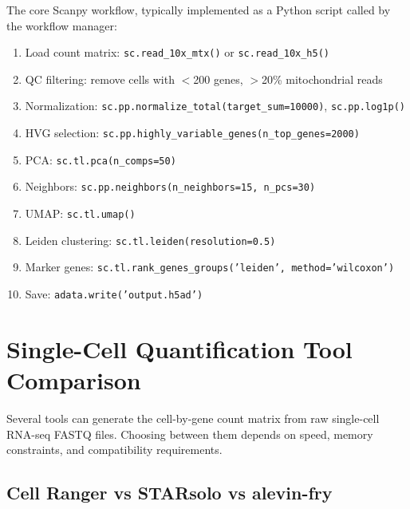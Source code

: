 \begin{protocolbox}[title={Scanpy Processing Script (scripts/run\_scanpy.py)}]
The core Scanpy workflow, typically implemented as a Python script called by the workflow manager:
\begin{enumerate}[nosep]
  \item Load count matrix: \texttt{sc.read\_10x\_mtx()} or \texttt{sc.read\_10x\_h5()}
  \item QC filtering: remove cells with $<$200 genes, $>$20\% mitochondrial reads
  \item Normalization: \texttt{sc.pp.normalize\_total(target\_sum=10000)}, \texttt{sc.pp.log1p()}
  \item HVG selection: \texttt{sc.pp.highly\_variable\_genes(n\_top\_genes=2000)}
  \item PCA: \texttt{sc.tl.pca(n\_comps=50)}
  \item Neighbors: \texttt{sc.pp.neighbors(n\_neighbors=15, n\_pcs=30)}
  \item UMAP: \texttt{sc.tl.umap()}
  \item Leiden clustering: \texttt{sc.tl.leiden(resolution=0.5)}
  \item Marker genes: \texttt{sc.tl.rank\_genes\_groups('leiden', method='wilcoxon')}
  \item Save: \texttt{adata.write('output.h5ad')}
\end{enumerate}
\end{protocolbox}

\section{Single-Cell Quantification Tool Comparison}
\label{sec:wf:sctools}

Several tools can generate the cell-by-gene count matrix from raw single-cell RNA-seq FASTQ files. Choosing between them depends on speed, memory constraints, and compatibility requirements.

\subsection{Cell Ranger vs STARsolo vs alevin-fry}

